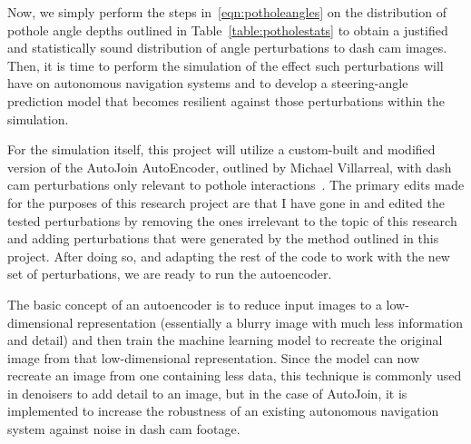 \documentclass{article}
\begin{document}
Now, we simply perform the steps in~\ref{eqn:potholeangles} on the distribution of pothole angle depths outlined in Table~\ref{table:potholestats} to obtain a justified and statistically sound distribution of angle perturbations to dash cam images. Then, it is time to perform the simulation of the effect such perturbations will have on autonomous navigation systems and to develop a steering-angle prediction model that becomes resilient against those perturbations within the simulation.

For the simulation itself, this project will utilize a custom-built and modified version of the AutoJoin AutoEncoder, outlined by Michael Villarreal, with dash cam perturbations only relevant to pothole interactions~\cite{villarreal2022autojoin}. The primary edits made for the purposes of this research project are that I have gone in and edited the tested perturbations by removing the ones irrelevant to the topic of this research and adding perturbations that were generated by the method outlined in this project. After doing so, and adapting the rest of the code to work with the new set of perturbations, we are ready to run the autoencoder.

The basic concept of an autoencoder is to reduce input images to a low-dimensional representation (essentially a blurry image with much less information and detail) and then train the machine learning model to recreate the original image from that low-dimensional representation. Since the model can now recreate an image from one containing less data, this technique is commonly used in denoisers to add detail to an image, but in the case of AutoJoin, it is implemented to increase the robustness of an existing autonomous navigation system against noise in dash cam footage.
\end{document}
